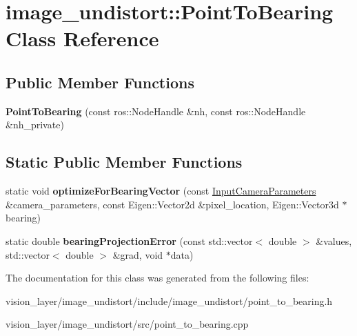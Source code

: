 \hypertarget{classimage__undistort_1_1PointToBearing}{}\section{image\+\_\+undistort\+:\+:Point\+To\+Bearing Class Reference}
\label{classimage__undistort_1_1PointToBearing}
\subsection*{Public Member Functions}
\begin{DoxyCompactItemize}
\item 
\mbox{\label{classimage__undistort_1_1PointToBearing_a600a5046d6a0951c8c49c4529ac5cb4e}} 
{\bfseries Point\+To\+Bearing} (const ros\+::\+Node\+Handle \&nh, const ros\+::\+Node\+Handle \&nh\+\_\+private)
\end{DoxyCompactItemize}
\subsection*{Static Public Member Functions}
\begin{DoxyCompactItemize}
\item 
\mbox{\label{classimage__undistort_1_1PointToBearing_ad1b979ad6cf875832e05aef2212c2d9b}} 
static void {\bfseries optimize\+For\+Bearing\+Vector} (const \hyperlink{classimage__undistort_1_1InputCameraParameters}{Input\+Camera\+Parameters} \&camera\+\_\+parameters, const Eigen\+::\+Vector2d \&pixel\+\_\+location, Eigen\+::\+Vector3d $\ast$bearing)
\item 
\mbox{\label{classimage__undistort_1_1PointToBearing_a4350a8a1675011e62511241fee50f892}} 
static double {\bfseries bearing\+Projection\+Error} (const std\+::vector$<$ double $>$ \&values, std\+::vector$<$ double $>$ \&grad, void $\ast$data)
\end{DoxyCompactItemize}


The documentation for this class was generated from the following files\+:\begin{DoxyCompactItemize}
\item 
vision\+\_\+layer/image\+\_\+undistort/include/image\+\_\+undistort/point\+\_\+to\+\_\+bearing.\+h\item 
vision\+\_\+layer/image\+\_\+undistort/src/point\+\_\+to\+\_\+bearing.\+cpp\end{DoxyCompactItemize}

